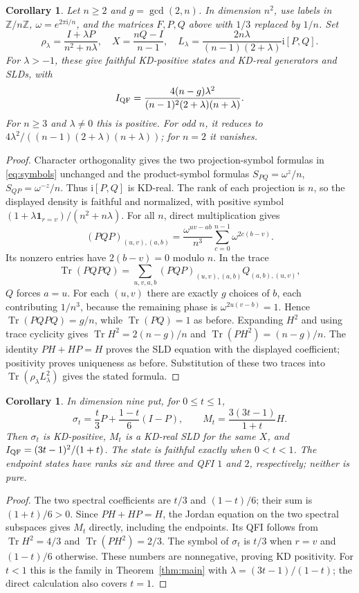 \documentclass[11pt]{article}
\newcommand{\Tr}{\operatorname{Tr}}
\newcommand{\ii}{\mathrm{i}}
\newtheorem{corollary}[theorem]{Corollary}
\begin{document}
\begin{corollary}\label{cor:square}
Let $n\ge2$ and $g=\gcd(2,n)$. In dimension $n^2$, use labels in $\mathbb Z/n\mathbb Z$,
$\omega=e^{2\pi\ii/n}$, and the matrices $F,P,Q$ above with $1/3$ replaced
by $1/n$. Set
\[
 \rho_\lambda=\frac{I+\lambda P}{n^2+n\lambda},\quad
 X=\frac{nQ-I}{n-1},\quad
 L_\lambda=\frac{2n\lambda}{(n-1)(2+\lambda)}\ii[P,Q].
\]
For $\lambda>-1$, these give faithful KD-positive states and KD-real
generators and SLDs, with
\[
 I_{\rm QF}=\frac{4(n-g)\lambda^2}{(n-1)^2(2+\lambda)(n+\lambda)}.
\]
For $n\ge3$ and $\lambda\ne0$ this is positive. For odd $n$, it reduces to
$4\lambda^2/((n-1)(2+\lambda)(n+\lambda))$; for $n=2$ it vanishes.
\end{corollary}
\begin{proof}
Character orthogonality gives the two projection-symbol formulas in
\eqref{eq:symbols} unchanged and the product-symbol formulas
$S_{PQ}=\omega^z/n$, $S_{QP}=\omega^{-z}/n$. Thus $\ii[P,Q]$ is KD-real.
The rank of each projection is $n$, so the displayed density is faithful
and normalized, with positive symbol
$(1+\lambda\mathbf1_{r=v})/(n^2+n\lambda)$.
For all $n$, direct multiplication gives
\[
 (PQP)_{(u,v),(a,b)}
 =\frac{\omega^{uv-ab}}{n^3}\sum_{c=0}^{n-1}\omega^{2c(b-v)}.
\]
Its nonzero entries have $2(b-v)=0$ modulo $n$. In the trace
\[
 \Tr(PQPQ)=\sum_{u,v,a,b}(PQP)_{(u,v),(a,b)}Q_{(a,b),(u,v)},
\]
$Q$ forces $a=u$. For each $(u,v)$ there are exactly $g$ choices of $b$,
each contributing $1/n^3$, because the remaining phase is
$\omega^{2u(v-b)}=1$. Hence $\Tr(PQPQ)=g/n$, while
$\Tr(PQ)=1$ as before. Expanding $H^2$ and using trace cyclicity gives
$\Tr H^2=2(n-g)/n$ and $\Tr(PH^2)=(n-g)/n$.
The identity $PH+HP=H$ proves the SLD equation with the displayed
coefficient; positivity proves uniqueness as before. Substitution of these
two traces into $\Tr(\rho_\lambda L_\lambda^2)$ gives the stated formula.
\end{proof}

\begin{corollary}\label{cor:endpoints}
In dimension nine put, for $0\le t\le1$,
\[
 \sigma_t=\frac{t}{3}P+\frac{1-t}{6}(I-P),\qquad
 M_t=\frac{3(3t-1)}{1+t}H.
\]
Then $\sigma_t$ is KD-positive, $M_t$ is a KD-real SLD for the same $X$,
and $I_{\rm QF}=(3t-1)^2/(1+t)$. The state is faithful exactly when
$0<t<1$. The endpoint states have ranks six and three and QFI $1$ and
$2$, respectively; neither is pure.
\end{corollary}
\begin{proof}
The two spectral coefficients are $t/3$ and $(1-t)/6$; their sum is
$(1+t)/6>0$. Since $PH+HP=H$, the Jordan equation on the two spectral
subspaces gives $M_t$ directly, including the endpoints. Its QFI follows
from $\Tr H^2=4/3$ and $\Tr(PH^2)=2/3$.
The symbol of $\sigma_t$ is $t/3$ when $r=v$ and $(1-t)/6$ otherwise.
These numbers are nonnegative, proving KD positivity. For $t<1$ this
is the family in Theorem~\ref{thm:main} with
$\lambda=(3t-1)/(1-t)$; the direct calculation also covers $t=1$.
\end{proof}
\end{document}
